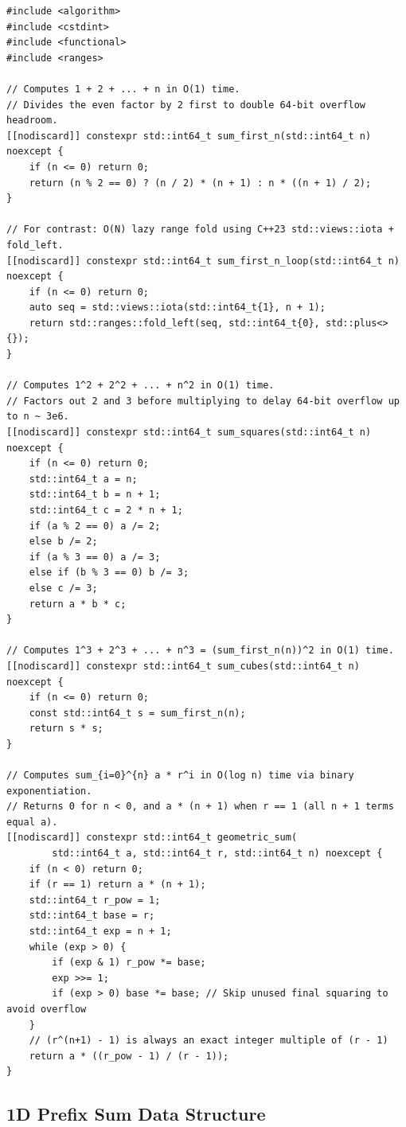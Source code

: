 \documentclass[11pt,a4paper]{article}
\theoremstyle{definition}
\begin{document}
\begin{lstlisting}[caption={Overflow-Safe Closed-Form Formulas, Binary Exponentiation, and C++23 Ranges}]
#include <algorithm>
#include <cstdint>
#include <functional>
#include <ranges>

// Computes 1 + 2 + ... + n in O(1) time.
// Divides the even factor by 2 first to double 64-bit overflow headroom.
[[nodiscard]] constexpr std::int64_t sum_first_n(std::int64_t n) noexcept {
    if (n <= 0) return 0;
    return (n % 2 == 0) ? (n / 2) * (n + 1) : n * ((n + 1) / 2);
}

// For contrast: O(N) lazy range fold using C++23 std::views::iota + fold_left.
[[nodiscard]] constexpr std::int64_t sum_first_n_loop(std::int64_t n) noexcept {
    if (n <= 0) return 0;
    auto seq = std::views::iota(std::int64_t{1}, n + 1);
    return std::ranges::fold_left(seq, std::int64_t{0}, std::plus<>{});
}

// Computes 1^2 + 2^2 + ... + n^2 in O(1) time.
// Factors out 2 and 3 before multiplying to delay 64-bit overflow up to n ~ 3e6.
[[nodiscard]] constexpr std::int64_t sum_squares(std::int64_t n) noexcept {
    if (n <= 0) return 0;
    std::int64_t a = n;
    std::int64_t b = n + 1;
    std::int64_t c = 2 * n + 1;
    if (a % 2 == 0) a /= 2;
    else b /= 2;
    if (a % 3 == 0) a /= 3;
    else if (b % 3 == 0) b /= 3;
    else c /= 3;
    return a * b * c;
}

// Computes 1^3 + 2^3 + ... + n^3 = (sum_first_n(n))^2 in O(1) time.
[[nodiscard]] constexpr std::int64_t sum_cubes(std::int64_t n) noexcept {
    if (n <= 0) return 0;
    const std::int64_t s = sum_first_n(n);
    return s * s;
}

// Computes sum_{i=0}^{n} a * r^i in O(log n) time via binary exponentiation.
// Returns 0 for n < 0, and a * (n + 1) when r == 1 (all n + 1 terms equal a).
[[nodiscard]] constexpr std::int64_t geometric_sum(
        std::int64_t a, std::int64_t r, std::int64_t n) noexcept {
    if (n < 0) return 0;
    if (r == 1) return a * (n + 1);
    std::int64_t r_pow = 1;
    std::int64_t base = r;
    std::int64_t exp = n + 1;
    while (exp > 0) {
        if (exp & 1) r_pow *= base;
        exp >>= 1;
        if (exp > 0) base *= base; // Skip unused final squaring to avoid overflow
    }
    // (r^(n+1) - 1) is always an exact integer multiple of (r - 1)
    return a * ((r_pow - 1) / (r - 1));
}
\end{lstlisting}

\subsection{1D Prefix Sum Data Structure}
\end{document}
